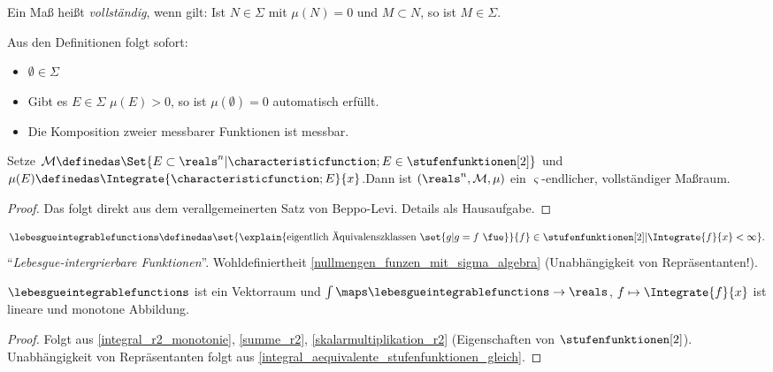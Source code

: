 Ein Maß heißt \emph{vollständig}, wenn gilt: Ist \( N\in \Sigma \) mit \( \mu(N)=0 \) und \( M\subset N \), so ist \( M\in \Sigma \).
\begin{bemerkung*}
  Aus den Definitionen folgt sofort:
  \begin{itemize}
    \item \( \emptyset\in \Sigma \)
    \item Gibt es \( E\in \Sigma \) \sd \( \mu(E)>0 \), so ist \( \mu(\emptyset)=0 \) automatisch erfüllt.
    \item Die Komposition zweier messbarer Funktionen ist messbar.
  \end{itemize}
\end{bemerkung*}
\begin{satz}\label{massraum_integration}
   Setze \( \mathcal{M}\definedas \Set{E\subset \reals^n|\characteristicfunction;{E}\in \stufenfunktionen[2]} \) und \( \mu(E)\definedas \Integrate{\characteristicfunction;{E}}{x} \).Dann ist \( (\reals^n,\mathcal{M},\mu) \) ein \( \varsigma \)-endlicher, vollständiger Maßraum.
\end{satz}
\begin{proof}
  Das folgt direkt aus dem verallgemeinerten Satz von Beppo-Levi. Details als Hausaufgabe.
\end{proof}
\begin{definition*}
  \begin{equation*}
    \lebesgueintegrablefunctions\definedas \set{\explain{\text{eigentlich Äquivalenszklassen }\set{g|g=f \text{ \fue}}}{f}\in \stufenfunktionen[2]|\Integrate{f}{x}<\infty}.
  \end{equation*}
  \enquote{\emph{Lebesgue-intergrierbare Funktionen}}. Wohldefiniertheit \ref{nullmengen_funzen_mit_sigma_algebra} (Unabhängigkeit von Repräsentanten!). 
\end{definition*}
\begin{proposition}\label{lebesgue_integrable_funktionen_vektorraum}
  \( \lebesgueintegrablefunctions \) ist ein Vektorraum und \( \int \maps \lebesgueintegrablefunctions\to \reals \), \( f\mapsto \Integrate{f}{x} \) ist lineare und monotone Abbildung.
\end{proposition}
\begin{proof}
  Folgt aus \ref{integral_r2_monotonie}, \ref{summe_r2}, \ref{skalarmultiplikation_r2} (Eigenschaften von \( \stufenfunktionen[2] \)). Unabhängigkeit von Repräsentanten folgt aus \ref{integral_aequivalente_stufenfunktionen_gleich}.
  
\end{proof}
